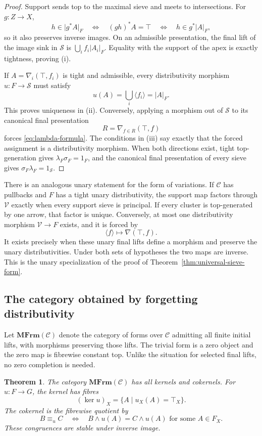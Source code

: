 \documentclass[12pt,oneside,reqno]{amsart}
\newtheorem{theorem}{Theorem}[section]
\theoremstyle{definition}
\theoremstyle{remark}
\newcommand{\C}{\mathcal C}
\newcommand{\MFrm}{\mathbf{MFrm}}
\newcommand{\Sieve}{\mathscr S}
\newcommand{\Var}{\mathscr V}
\newcommand{\supp}[2][]{\lvert #2\rvert_{#1}}
\newcommand{\prin}[1]{\langle #1\rangle}
\begin{document}
\begin{proof}
Support sends top to the maximal sieve and meets to intersections.  For
\(g:Z\to X\),
\[
 h\in\supp[F]{g^*A}
 \quad\Longleftrightarrow\quad
 (gh)^*A=\top
 \quad\Longleftrightarrow\quad
 h\in g^*\supp[F]{A},
\]
so it also preserves inverse images.  On an admissible presentation,
the final lift of the image sink in \(\Sieve\) is
\(\bigcup_i f_i\supp[F]{A_i}\).  Equality with the support of the apex
is exactly tightness, proving (i).

If \(A=\nabla_i(\top,f_i)\) is tight and admissible, every
distributivity morphism \(u:F\to\Sieve\) must satisfy
\[
 u(A)=\bigcup_i\prin{f_i}=\supp[F]{A}.
\]
This proves uniqueness in (ii).  Conversely, applying a morphism out
of \(\Sieve\) to its canonical final presentation
\[
                 R=\nabla_{f\in R}(\top,f)
\]
forces \eqref{eq:lambda-formula}.  The conditions in (iii) say exactly
that the forced assignment is a distributivity morphism.  When both
directions exist, tight top-generation gives
\(\lambda_F\sigma_F=1_F\), and the canonical final presentation of every
sieve gives \(\sigma_F\lambda_F=1_{\Sieve}\).
\end{proof}

There is an analogous unary statement for the form of variations.  If
\(\C\) has pullbacks and \(F\) has a tight unary distributivity, the
support map factors through \(\Var\) exactly when every support sieve is
principal.  If every cluster is top-generated by one arrow, that factor
is unique.  Conversely, at most one distributivity morphism
\(\Var\to F\) exists, and it is forced by
\[
                         \prin f\longmapsto\nabla(\top,f).
\]
It exists precisely when these unary final lifts define a morphism and
preserve the unary distributivities.  Under both sets of hypotheses the
two maps are inverse.  This is the unary specialization of the proof of
Theorem~\ref{thm:universal-sieve-form}.

\subsection{The category obtained by forgetting distributivity}

Let \(\MFrm(\C)\) denote the category of forms over \(\C\) admitting
all finite initial lifts, with morphisms preserving those lifts.  The
trivial form is a zero object and the zero map is fibrewise constant
top.  Unlike the situation for selected final lifts, no zero completion
is needed.

\begin{theorem}\label{thm:underlying-kernels-cokernels}
The category \(\MFrm(\C)\) has all kernels and cokernels.  For
\(u:F\to G\), the kernel has fibres
\[
                    (\ker u)_X=\{A\mid u_X(A)=\top_X\}.
\]
The cokernel is the fibrewise quotient by
\begin{equation}\label{eq:underlying-cokernel-relation}
 B\equiv_u C
 \quad\Longleftrightarrow\quad
 B\wedge u(A)=C\wedge u(A)
 \text{ for some }A\in F_X.
\end{equation}
These congruences are stable under inverse image.
\end{theorem}
\end{document}
